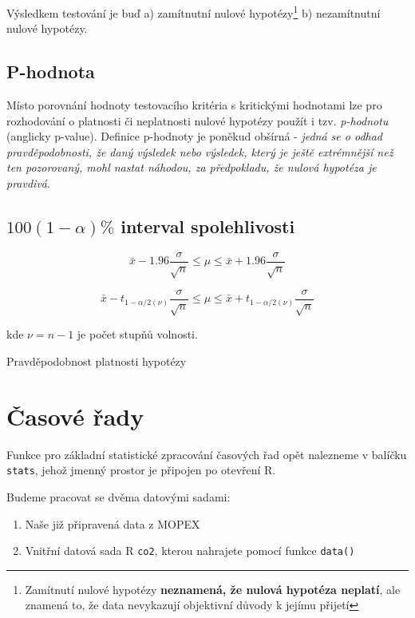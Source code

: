 \documentclass[
  letterpaper,
  DIV=11,
  numbers=noendperiod]{scrreprt}
\providecommand{\tightlist}{%
  \setlength{\itemsep}{0pt}\setlength{\parskip}{0pt}}\usepackage{longtable,booktabs,array}
\begin{document}
Výsledkem testování je buď a) zamítnutní nulové hypotézy\footnote{Zamítnutí
  nulové hypotézy \textbf{neznamená, že nulová hypotéza neplatí}, ale
  znamená to, že data nevykazují objektivní důvody k jejímu přijetí} b)
nezamítnutní nulové hypotézy.

\hypertarget{p-hodnota}{%
\section{P-hodnota}\label{p-hodnota}}

Místo porovnání hodnoty testovacího kritéria s kritickými hodnotami lze
pro rozhodování o platnosti či neplatnosti nulové hypotézy použít i tzv.
\emph{p-hodnotu} (anglicky p-value). Definice p-hodnoty je poněkud
obšírná - \emph{jedná se o odhad pravděpodobnosti, že daný výsledek nebo
výsledek, který je ještě extrémnější než ten pozorovaný, mohl nastat
náhodou, za předpokladu, že nulová hypotéza je pravdivá}.

\hypertarget{alpha-interval-spolehlivosti}{%
\section{\texorpdfstring{\(100(1-\alpha)\%\) interval
spolehlivosti}{100(1-\textbackslash alpha)\textbackslash\% interval spolehlivosti}}\label{alpha-interval-spolehlivosti}}

\[
\bar{x} - 1.96\dfrac{\sigma}{\sqrt{n}}\leq\mu\leq \bar{x} + 1.96\dfrac{\sigma}{\sqrt{n}}
\]

\[
\bar{x} - t_{1-\alpha/2(\nu)}\dfrac{\sigma}{\sqrt{n}}\leq\mu\leq \bar{x} + t_{1-\alpha/2(\nu)}\dfrac{\sigma}{\sqrt{n}}
\]

kde \(\nu=n-1\) je počet stupňů volnosti.

Pravděpodobnost platnosti hypotézy


\hypertarget{ux10dasovuxe9-ux159ady}{%
\chapter{Časové řady}\label{ux10dasovuxe9-ux159ady}}

Funkce pro základní statistické zpracování časových řad opět nalezneme v
balíčku \texttt{stats}, jehož jmenný prostor je připojen po otevření R.

Budeme pracovat se dvěma datovými sadami:

\begin{enumerate}
\def\labelenumi{\arabic{enumi}.}
\tightlist
\item
  Naše již připravená data z MOPEX
\item
  Vnitřní datová sada R \texttt{co2}, kterou nahrajete pomocí funkce
  \texttt{data()}
\end{enumerate}
\end{document}
